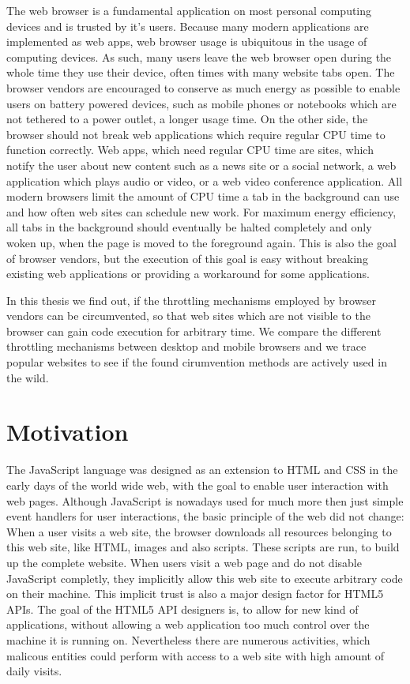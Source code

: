 \documentclass[
	ngerman,
	ruledheaders=section,%
	class=report,%
	thesis={type=bachelor},%
	accentcolor=9c,%
	custommargins=true,%
	marginpar=false,%
	parskip=half-,%
	fontsize=11pt,%
]{tudapub}
\begin{document}
  The web browser is a fundamental application on most personal computing devices and is trusted by it's users. Because many modern applications are implemented as web apps, web browser usage is ubiquitous in the usage of computing devices. As such, many users leave the web browser open during the whole time they use their device, often times with many website tabs open. The browser vendors are encouraged to conserve as much energy as possible to enable users on battery powered devices, such as mobile phones or notebooks which are not tethered to a power outlet, a longer usage time. On the other side, the browser should not break web applications which require regular CPU time to function correctly. Web apps, which need regular CPU time are sites, which notify the user about new content such as a news site or a social network, a web application which plays audio or video, or a web video conference application. All modern browsers limit the amount of CPU time a tab in the background can use and how often web sites can schedule new work. For maximum energy efficiency, all tabs in the background should eventually be halted completely and only woken up, when the page is moved to the foreground again. This is also the goal of browser vendors\cite{chrome-background-tabs-roadmap}, but the execution of this goal is easy without breaking existing web applications or providing a workaround for some applications.

  In this thesis we find out, if the throttling mechanisms employed by browser vendors can be circumvented, so that web sites which are not visible to the browser can gain code execution for arbitrary time. We compare the different throttling mechanisms between desktop and mobile browsers and we trace popular websites to see if the found cirumvention methods are actively used in the wild.
  
  \section{Motivation}

  The JavaScript language was designed as an extension to HTML and CSS in the early days of the world wide web, with the goal to enable user interaction with web pages. Although JavaScript is nowadays used for much more then just simple event handlers for user interactions, the basic principle of the web did not change: When a user visits a web site, the browser downloads all resources belonging to this web site, like HTML, images and also scripts. These scripts are run, to build up the complete website. When users visit a web page and do not disable JavaScript completly, they implicitly allow this web site to execute arbitrary code on their machine. This implicit trust is also a major design factor for HTML5 APIs. The goal of the HTML5 API designers is, to allow for new kind of applications, without allowing a web application too much control over the machine it is running on. Nevertheless there are numerous activities, which malicous entities could perform with access to a web site with high amount of daily visits.
\end{document}
